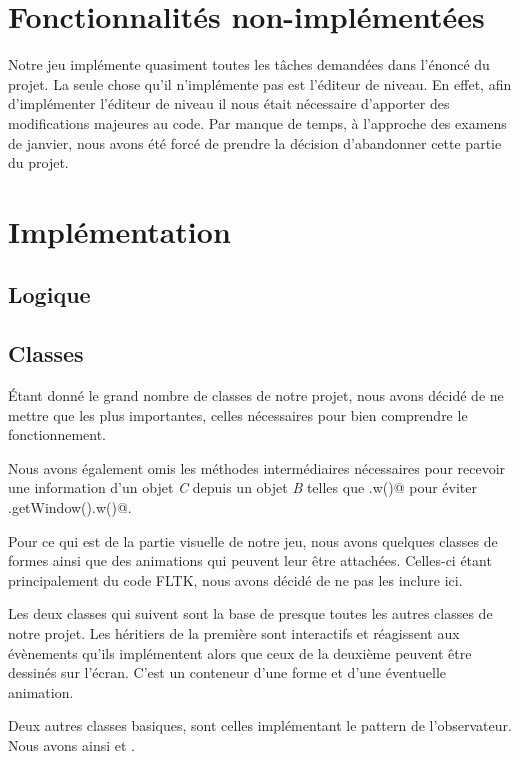 \documentclass[11pt,a4paper]{article}
\newcommand{\addcode}[3]{
	\begin{figure}[H]
		\centering
		
	\end{figure}
}
\begin{document}
\section{Fonctionnalités non-implémentées}
Notre jeu implémente quasiment toutes les tâches demandées dans l'énoncé du projet. 
La seule chose qu'il n'implémente pas est l'éditeur de niveau. En effet, afin d'implémenter 
l'éditeur de niveau il nous était nécessaire d'apporter des modifications majeures au code.
Par manque de temps, à l'approche des examens de janvier, nous avons été forcé de prendre 
la décision d'abandonner cette partie du projet.

\section{Implémentation}
\subsection{Logique}


\subsection{Classes}

Étant donné le grand nombre de classes de notre projet, nous
avons décidé de ne mettre que les plus importantes, celles
nécessaires pour bien comprendre le fonctionnement.

Nous avons également omis les méthodes intermédiaires
nécessaires pour recevoir une information d'un objet
\emph{C} depuis un objet \emph{B} telles que \verb@b.w()@ pour
éviter \verb@b.getWindow().w()@.

Pour ce qui est de la partie visuelle de notre jeu, nous
avons quelques classes de formes ainsi que des animations
qui peuvent leur être attachées. Celles-ci étant
principalement du code FLTK, nous avons décidé de ne pas les
inclure ici.

Les deux classes qui suivent sont la base de presque toutes
les autres classes de notre projet. Les héritiers de la
première sont interactifs et réagissent aux évènements
qu'ils implémentent alors que ceux de la deuxième peuvent
être dessinés sur l'écran. C'est un conteneur d'une forme et
d'une éventuelle animation.

\addcode{code/interactive.hpp}{C++}{}{}
\addcode{code/drawableContainer.hpp}{C++}{}{}

Deux autres classes basiques, sont celles implémentant le
pattern de l'observateur. Nous avons ainsi \verb@Observer@
et \verb@Subject@.
\end{document}
